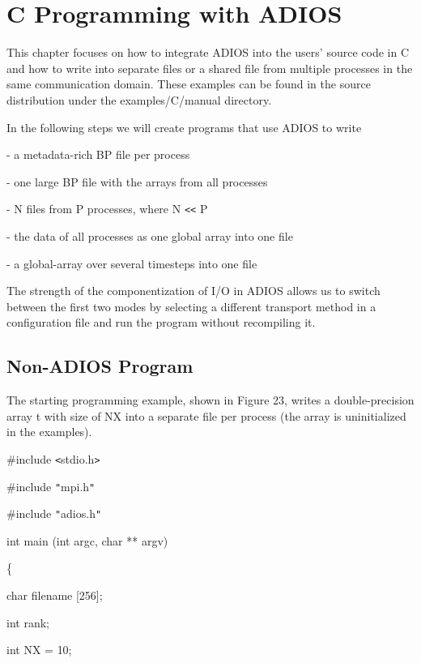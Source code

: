 \chapter{C Programming with ADIOS}

This chapter focuses on how to integrate ADIOS into the users' source code in C 
and how to write into separate files or a shared file from multiple processes in 
the same communication domain. These examples can be found in the source distribution 
under the examples/C/manual directory.

In the following steps we will create programs that use ADIOS to write

- a metadata-rich BP file per process

- one large BP file with the arrays from all processes

- N files from P processes, where N \texttt{<}\texttt{<} P

- the data of all processes as one global array into one file

- a global-array over several timesteps into one file

The strength of the componentization of I/O in ADIOS allows us to switch between 
the first two modes by selecting a different transport method in a configuration 
file and run the program without recompiling it. 

\section{Non-ADIOS Program}

The starting programming example, shown in Figure 23, writes a double-precision 
array t with size of NX into a separate file per process (the array is uninitialized 
in the examples). 

\#include \texttt{<}stdio.h\texttt{>}

\#include \texttt{"}mpi.h\texttt{"}

\#include \texttt{"}adios.h\texttt{"}

int main (int argc, char ** argv) 

\{

\leftskip=18pt
char      \textbf{    } filename [256];

int              rank;

int              NX\textbf{ }=\textbf{ }10;

